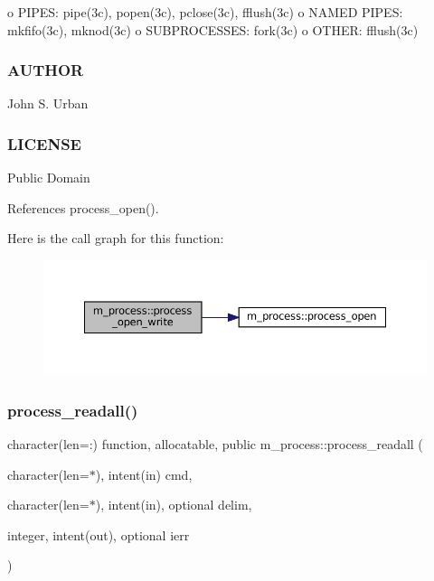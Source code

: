 o P\+I\+P\+ES\+: pipe(3c), popen(3c), pclose(3c), fflush(3c) o N\+A\+M\+ED P\+I\+P\+ES\+: mkfifo(3c), mknod(3c) o S\+U\+B\+P\+R\+O\+C\+E\+S\+S\+ES\+: fork(3c) o O\+T\+H\+ER\+: fflush(3c) \subsubsection*{A\+U\+T\+H\+OR}

John S. Urban \subsubsection*{L\+I\+C\+E\+N\+SE}

Public Domain 

References process\+\_\+open().

Here is the call graph for this function\+:\nopagebreak
\begin{figure}[H]
\begin{center}
\leavevmode
\includegraphics[width=350pt]{namespacem__process_aa6ed1404ab3472f5068ed15a7a01defc_cgraph}
\end{center}
\end{figure}
\mbox{\label{namespacem__process_a7dd759a1344789477ae1e205d7fa9a51}} 
\subsubsection{\texorpdfstring{process\+\_\+readall()}{process\_readall()}}
{\footnotesize\ttfamily character(len=\+:) function, allocatable, public m\+\_\+process\+::process\+\_\+readall (\begin{DoxyParamCaption}\item[{character(len=$\ast$), intent(in)}]{cmd,  }\item[{character(len=$\ast$), intent(in), optional}]{delim,  }\item[{integer, intent(out), optional}]{ierr }\end{DoxyParamCaption})}



